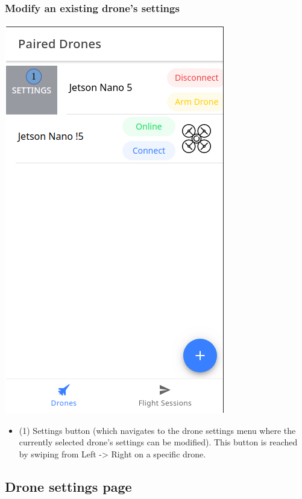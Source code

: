 \subsubsection{Modify an existing drone's settings}
\begin{minipage}[c]{0.5\linewidth}
	\centering
	\includegraphics[scale=0.4]{./assets/images/settings.png}
	\label{fig: mainPageAddDrone}
\end{minipage}
\begin{minipage}[c]{0.5\linewidth}
	\begin{itemize}
		\item (1) Settings button (which navigates to the drone settings menu where the currently selected drone's settings can be modified). This button is reached by swiping from Left -> Right on a specific drone.
	\end{itemize}
\end{minipage}

\subsection{Drone settings page}
